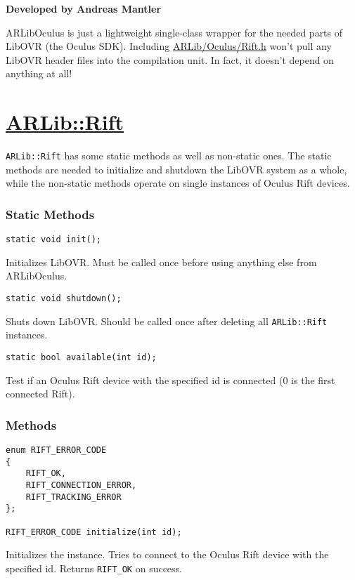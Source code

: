 \begin{center}
\textbf{Developed by Andreas Mantler}
\end{center}
ARLibOculus is just a lightweight single-class wrapper for the needed parts of LibOVR (the Oculus SDK)\cite{dk2}.
Including \href{https://github.com/ands/OculusMeetsAR/blob/master/ARLib/include/ARLib/Oculus/Rift.h}{ARLib/Oculus/Rift.h} won't pull any LibOVR header files into the compilation unit.
In fact, it doesn't depend on anything at all!

\section{\texorpdfstring{\href{https://github.com/ands/OculusMeetsAR/blob/master/ARLib/include/ARLib/Oculus/Rift.h}{ARLib::Rift}}{ARLib::Rift}}\label{arlibrift}
\texttt{ARLib::Rift} has some static methods as well as non-static ones.
The static methods are needed to initialize and shutdown the LibOVR system as a whole,
while the non-static methods operate on single instances of Oculus Rift devices.

\subsubsection{Static Methods}\label{static-methods}

\begin{lstlisting}
static void init();
\end{lstlisting}
Initializes LibOVR. Must be called once before using anything else from ARLibOculus.

\begin{lstlisting}
static void shutdown();
\end{lstlisting}
Shuts down LibOVR. Should be called once after deleting all \texttt{ARLib::Rift} instances.

\begin{lstlisting}
static bool available(int id);
\end{lstlisting}
Test if an Oculus Rift device with the specified id is connected (0 is the first connected Rift).

\subsubsection{Methods}\label{methods}

\begin{lstlisting}
enum RIFT_ERROR_CODE
{
    RIFT_OK,
    RIFT_CONNECTION_ERROR,
    RIFT_TRACKING_ERROR
};

RIFT_ERROR_CODE initialize(int id);
\end{lstlisting}
Initializes the instance. Tries to connect to the Oculus Rift device with the specified id. Returns \texttt{RIFT\_OK} on success.


